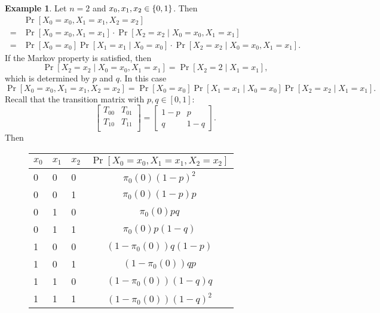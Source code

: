 \documentclass[12pt,openany]{book}
\theoremstyle{definition}
\newtheorem{example}{Example}[chapter]
\begin{document}
	\newpage
	\begin{example}
		Let $n=2$ and $x_0,x_1,x_2\in\set{0,1}$. Then \begin{align*}
			&\Pr[X_0=x_0,X_1=x_1,X_2=x_2]\\=&
			\Pr[X_0=x_0,X_1=x_1]\cdot\Pr[X_2=x_2\mid X_0=x_0,X_1=x_1]\\=&
			\Pr[X_0=x_0]\Pr[X_1=x_1\mid X_0=x_0]\cdot\Pr[X_2=x_2\mid X_0=x_0,X_1=x_1].
		\end{align*} If the Markov property is satisfied, then \[
		\Pr[X_2=x_2\mid X_0=x_0,X_1=x_1]=\Pr[X_2=2\mid X_1=x_1],
	\] which is determined by $p$ and $q$. In this case \[
	\Pr[X_0=x_0,X_1=x_1,X_2=x_2]=\Pr[X_0=x_0]\Pr[X_1=x_1\mid X_0=x_0]\Pr[X_2=x_2\mid X_1=x_1].
	\] Recall that the transition matrix with $p,q\in[0,1]$: \[
	\begin{bmatrix}
		T_{00} & T_{01}\\
		T_{10} & T_{11}\\
	\end{bmatrix}=\begin{bmatrix}
		1-p & p\\
		q & 1-q
	\end{bmatrix}.
	\] Then \begin{figure}[h!]\centering
		\begin{tabularx}{\textwidth}{XXX|c}
			\toprule[1.2pt]
			$x_0$ &$x_1$& $x_2$ & $\Pr[X_0=x_0,X_1=x_1,X_2=x_2]$\\
			\midrule
			0& 0& 0     &$\pi_0(0)(1-p)^2$\\
			\hline
			0& 0& 1     &$\pi_0(0)(1-p)p$\\
			\hline
			0& 1& 0     &$\pi_0(0)pq$\\
			\hline
			0& 1& 1     &$\pi_0(0)p(1-q)$\\
			\hline
			\hline
			1& 0& 0     &$(1-\pi_0(0))q(1-p)$\\
			\hline
			1& 0& 1     &$(1-\pi_0(0))qp$\\
			\hline
			1& 1& 0     &$(1-\pi_0(0))(1-q)q$\\
			\hline
			1& 1& 1     &$(1-\pi_0(0))(1-q)^2$\\
			\bottomrule[1.2pt]
		\end{tabularx}
	\end{figure}
	\end{example}
	
\end{document}
